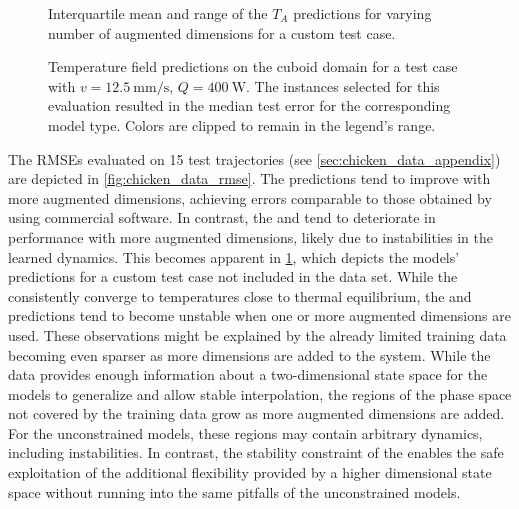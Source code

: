 \begin{figure}[t]
    \centering
    \vspace*{-2mm}
    \caption{Interquartile mean and range of the $T_A$ predictions for varying number of augmented dimensions for a custom test case.
    }
    \label{fig:chicken_data_best_predictions_relaxation}
        \vskip -0.3cm
\end{figure}

\begin{figure*}[ht]
    \centering
    \vspace*{-3mm}
    \vspace*{-1mm}
    \caption{Temperature field predictions on the cuboid domain for a test case with $v=\qty{12.5}{\milli\metre\per\second}$, $Q=\qty{400}{\watt}$. The instances selected for this evaluation resulted in the median test error for the corresponding model type. Colors are clipped to remain in the legend's range.}
    \label{fig:ded_mesh_predictions}
    \vskip -0.4cm
\end{figure*}

The \glspl{RMSE} evaluated on 15 test trajectories (see \cref{sec:chicken_data_appendix}) are depicted in \cref{fig:chicken_data_rmse}. 
The \sPHNN predictions tend to improve with more augmented dimensions, achieving errors comparable to those obtained by \citet{kannapinn2022} using commercial software.
In contrast, the \NODEs and \PHNNs tend to deteriorate in performance with more augmented dimensions, likely due to instabilities in the learned dynamics.
This becomes apparent in \cref{fig:chicken_data_best_predictions_relaxation}, which depicts the models' predictions for a custom test case not included in the data set. 
While the \sPHNNs consistently converge to temperatures close to thermal equilibrium, the \NODEs and \PHNNs predictions tend to become unstable when one or more augmented dimensions are used.
These observations might be explained by the already limited training data becoming even sparser as more dimensions are added to the system.
While the data provides enough information about a two-dimensional state space for the models to generalize and allow stable interpolation, the regions of the phase space not covered by the training data grow as more augmented dimensions are added.
For the unconstrained models, these regions may contain arbitrary dynamics, including instabilities.
In contrast, the stability constraint of the \sPHNN enables the safe exploitation of the additional flexibility provided by a higher dimensional state space without running into the same pitfalls of the unconstrained models. 

